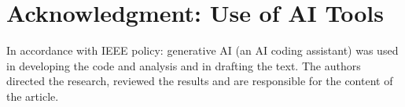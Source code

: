 \section*{Acknowledgment: Use of AI Tools}
In accordance with IEEE policy: generative AI (an AI coding assistant) was used in developing the code and analysis and in drafting the text. The authors directed the research, reviewed the results and are responsible for the content of the article.
